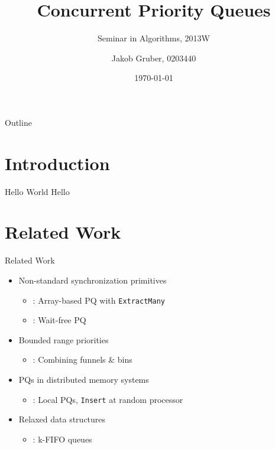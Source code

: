\documentclass{beamer}
\title{Concurrent Priority Queues}
\subtitle{Seminar in Algorithms, 2013W}
\author{Jakob Gruber, 0203440}
\date{\today}
\begin{document}
\maketitle

\begin{frame}{Outline}
\begin{minipage}[t][10em][t]{\linewidth}
\tableofcontents
\end{minipage}
\end{frame}

\section{Introduction}

\begin{frame}{Hello World}
Hello
\end{frame}

\section{Related Work}

\begin{frame}{Related Work}
\begin{itemize}
\item Non-standard synchronization primitives
    \begin{itemize}
    \item \citeauthor{liu2012lock}: Array-based PQ with \lstinline|ExtractMany|
    \item \citeauthor{israeli1993efficient}: Wait-free PQ
    \end{itemize}

\item Bounded range priorities
    \begin{itemize}
    \item \citeauthor{shavit1999scalable}: Combining funnels \& bins
    \end{itemize}

\item PQs in distributed memory systems
    \begin{itemize}
    \item \citeauthor{sanders1998randomized}: Local PQs, \lstinline|Insert| at random processor
    \end{itemize}

\item Relaxed data structures
    \begin{itemize}
    \item \citeauthor{kirsch2012fast}: k-FIFO queues
    \end{itemize}

\end{itemize}
\end{frame}
\end{document}
